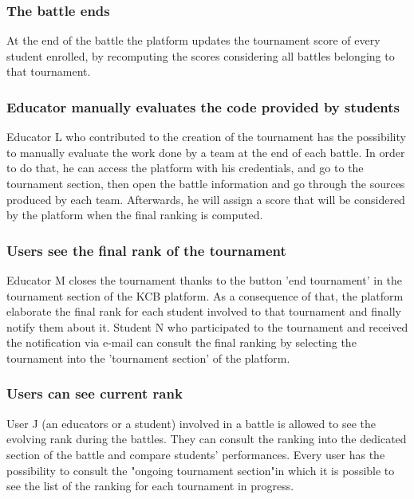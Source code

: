 \subsubsection{ The battle ends}
At the end of the battle the platform updates the tournament score of every student enrolled, by recomputing the scores considering all battles belonging to that tournament.


\subsubsection{ Educator manually evaluates the code provided by students}
Educator L who contributed to the creation of the tournament has the possibility to manually evaluate the work done by a team at the end of each battle. In order to do that, he can access the platform with his credentials, and go to the tournament section, then open the battle information and go through the sources produced by each team. Afterwards, he will assign a score that will be considered by the platform when the final ranking is computed.

\subsubsection{ Users see the final rank of the tournament}
Educator M closes the tournament thanks to the button 'end tournament' in the tournament section of the KCB platform. As a consequence of that, the platform elaborate the final rank for each student involved to that tournament and finally notify them about it. 
Student N who participated to the tournament and received the notification via e-mail can consult the final ranking by selecting the tournament into the 'tournament section' of the platform.

\subsubsection{ Users can see current rank}
User J (an educators or a student) involved in a battle is allowed to see the evolving rank during the battles. They can consult the ranking into the dedicated section of the battle and compare students' performances.
Every user has the possibility to consult the "ongoing tournament section"in which it is possible to see the list of the ranking for each tournament in progress. 

